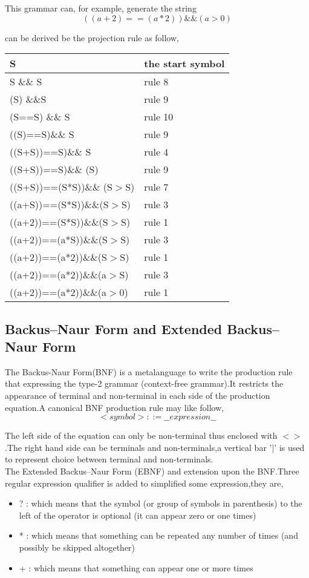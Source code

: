 This grammar can, for example, generate the string 
$$  ((a+2) == (a*2) )\&\& (a > 0)  $$

can be derived be the projection rule as follow,
 
\begin{tabular}{|l|l|}
\hline S & the start symbol\\ 
\hline S \&\& S & rule 8 \\ 
\hline  (S) \&\&S & rule 9\\ 
\hline   (S==S) \&\& S & rule 10 \\ 
\hline  ((S)==S)\&\& S  & rule  9\\ 
\hline ((S+S))==S)\&\& S & rule 4\\
\hline ((S+S))==S)\&\& (S) & rule 9 \\
\hline  ((S+S))==(S*S))\&\& (S$>$S) & rule 7\\
\hline ((a+S))==(S*S))\&\&(S$>$S)  & rule 3\\
\hline ((a+2))==(S*S))\&\&(S$>$S) & rule 1\\
\hline ((a+2))==(a*S))\&\&(S$>$S) & rule 3\\
\hline ((a+2))==(a*2))\&\&(S$>$S) & rule 1\\
\hline ((a+2))==(a*2))\&\&(a$>$S) & rule 3\\
\hline ((a+2))==(a*2))\&\&(a$>$0) & rule 1\\
\hline

\end{tabular} 
 
 






\subsection{Backus–Naur Form and Extended Backus–Naur Form}
The Backus-Naur Form(BNF) is a metalanguage to write the production rule that expressing the type-2 grammar (context-free grammar).It  restricts the appearance of terminal and non-terminal in each side of the production equation.A canonical BNF production rule may like follow,
 \[   <symbol> ::= \_\_expression\_\_ \]
 
The left side of the equation can only be non-terminal thus enclosed with $<>$ .The right hand side can be terminals and non-terminals,a vertical bar '|' is used to represent choice between terminal and non-terminals.\\

The  Extended Backus–Naur Form (EBNF) and extension upon the BNF.Three regular expression qualifier is added to simplified some expression,they are,
\begin{itemize}
\item ? : which means that the symbol (or group of symbols in parenthesis) to the left of the operator is
optional (it can appear zero or one times)
\item * : which means that something can be repeated any number of times (and possibly be skipped
altogether)
\item + : which means that something can appear one or more times 
\end{itemize} \cite{book}

